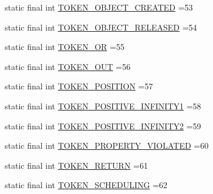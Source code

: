 \begin{DoxyCompactItemize}
\item 
static final int \hyperlink{classgov_1_1nasa_1_1jpf_1_1inspector_1_1server_1_1expression_1_1parser_1_1_expression_grammar_parser_aacf819d453c99a00a8113588ea893778}{T\+O\+K\+E\+N\+\_\+\+O\+B\+J\+E\+C\+T\+\_\+\+C\+R\+E\+A\+T\+ED} =53
\item 
static final int \hyperlink{classgov_1_1nasa_1_1jpf_1_1inspector_1_1server_1_1expression_1_1parser_1_1_expression_grammar_parser_ad965e0dcfe9c8dde9be01f282a17f30e}{T\+O\+K\+E\+N\+\_\+\+O\+B\+J\+E\+C\+T\+\_\+\+R\+E\+L\+E\+A\+S\+ED} =54
\item 
static final int \hyperlink{classgov_1_1nasa_1_1jpf_1_1inspector_1_1server_1_1expression_1_1parser_1_1_expression_grammar_parser_a58d1da7a1e088d5c9ec31125f10322dd}{T\+O\+K\+E\+N\+\_\+\+OR} =55
\item 
static final int \hyperlink{classgov_1_1nasa_1_1jpf_1_1inspector_1_1server_1_1expression_1_1parser_1_1_expression_grammar_parser_a8d288905d032cc63fc0d9bb8db2634c4}{T\+O\+K\+E\+N\+\_\+\+O\+UT} =56
\item 
static final int \hyperlink{classgov_1_1nasa_1_1jpf_1_1inspector_1_1server_1_1expression_1_1parser_1_1_expression_grammar_parser_a92690007c873c501ce11d3a6b3f00265}{T\+O\+K\+E\+N\+\_\+\+P\+O\+S\+I\+T\+I\+ON} =57
\item 
static final int \hyperlink{classgov_1_1nasa_1_1jpf_1_1inspector_1_1server_1_1expression_1_1parser_1_1_expression_grammar_parser_ad569bc33cc328fd86383146af86da825}{T\+O\+K\+E\+N\+\_\+\+P\+O\+S\+I\+T\+I\+V\+E\+\_\+\+I\+N\+F\+I\+N\+I\+T\+Y1} =58
\item 
static final int \hyperlink{classgov_1_1nasa_1_1jpf_1_1inspector_1_1server_1_1expression_1_1parser_1_1_expression_grammar_parser_aa35db486aa7edd4c744c6f7a766383f9}{T\+O\+K\+E\+N\+\_\+\+P\+O\+S\+I\+T\+I\+V\+E\+\_\+\+I\+N\+F\+I\+N\+I\+T\+Y2} =59
\item 
static final int \hyperlink{classgov_1_1nasa_1_1jpf_1_1inspector_1_1server_1_1expression_1_1parser_1_1_expression_grammar_parser_a57d08676bfaad8ed4c5f99fa43b9bfff}{T\+O\+K\+E\+N\+\_\+\+P\+R\+O\+P\+E\+R\+T\+Y\+\_\+\+V\+I\+O\+L\+A\+T\+ED} =60
\item 
static final int \hyperlink{classgov_1_1nasa_1_1jpf_1_1inspector_1_1server_1_1expression_1_1parser_1_1_expression_grammar_parser_aa8bdaa7f24eda5a29f18ee0a63e2373d}{T\+O\+K\+E\+N\+\_\+\+R\+E\+T\+U\+RN} =61
\item 
static final int \hyperlink{classgov_1_1nasa_1_1jpf_1_1inspector_1_1server_1_1expression_1_1parser_1_1_expression_grammar_parser_ad7c1983d75440cdcd8659d2559fd4c0a}{T\+O\+K\+E\+N\+\_\+\+S\+C\+H\+E\+D\+U\+L\+I\+NG} =62

\end{DoxyCompactItemize}
